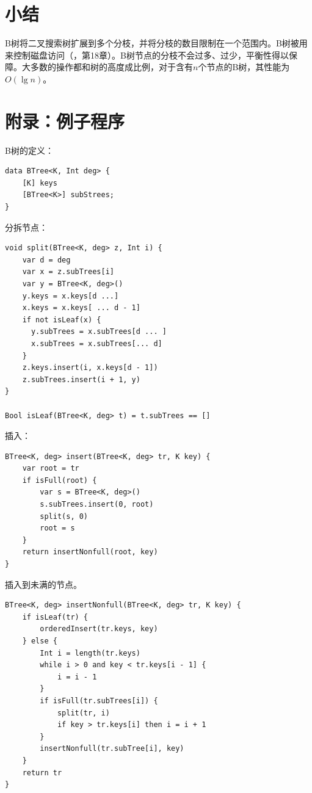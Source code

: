 \documentclass[b5paper]{ctexart}
\begin{document}
\begin{Exercise}
\end{Exercise}

\section{小结}

B树将二叉搜索树扩展到多个分枝，并将分枝的数目限制在一个范围内。B树被用来控制磁盘访问（\cite{CLRS}，第18章）。B树节点的分枝不会过多、过少，平衡性得以保障。大多数的操作都和树的高度成比例，对于含有$n$个节点的B树，其性能为$O(\lg n)$。

\section{附录：例子程序}

B树的定义：

\begin{lstlisting}[language = Bourbaki]
data BTree<K, Int deg> {
    [K] keys
    [BTree<K>] subStrees;
}
\end{lstlisting}

分拆节点：

\begin{lstlisting}[language = Bourbaki]
void split(BTree<K, deg> z, Int i) {
    var d = deg
    var x = z.subTrees[i]
    var y = BTree<K, deg>()
    y.keys = x.keys[d ...]
    x.keys = x.keys[ ... d - 1]
    if not isLeaf(x) {
      y.subTrees = x.subTrees[d ... ]
      x.subTrees = x.subTrees[... d]
    }
    z.keys.insert(i, x.keys[d - 1])
    z.subTrees.insert(i + 1, y)
}

Bool isLeaf(BTree<K, deg> t) = t.subTrees == []
\end{lstlisting}

插入：

\begin{lstlisting}[language = Bourbaki]
BTree<K, deg> insert(BTree<K, deg> tr, K key) {
    var root = tr
    if isFull(root) {
        var s = BTree<K, deg>()
        s.subTrees.insert(0, root)
        split(s, 0)
        root = s
    }
    return insertNonfull(root, key)
}
\end{lstlisting}

插入到未满的节点。

\begin{lstlisting}[language = Bourbaki]
BTree<K, deg> insertNonfull(BTree<K, deg> tr, K key) {
    if isLeaf(tr) {
        orderedInsert(tr.keys, key)
    } else {
        Int i = length(tr.keys)
        while i > 0 and key < tr.keys[i - 1] {
            i = i - 1
        }
        if isFull(tr.subTrees[i]) {
            split(tr, i)
            if key > tr.keys[i] then i = i + 1
        }
        insertNonfull(tr.subTree[i], key)
    }
    return tr
}
\end{lstlisting}
\end{document}
